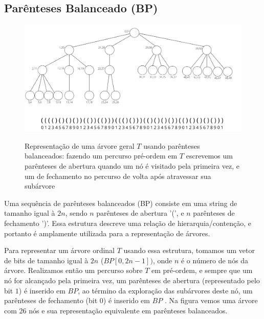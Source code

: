 \subsection{Parênteses Balanceado (BP)}\label{sec:sec-parenthesis-balanceados}
\begin{figure}[!ht]
\centering
  \caption[Representação de árvores com parênteses balanceados]{Representação de uma árvore geral $T$ usando parênteses balanceados: fazendo um percurso pré-ordem em $T$ escrevemos um parênteses de abertura quando um nó é visitado pela primeira vez, e um de fechamento no percurso de volta após atravessar sua subárvore \citep{paper-succint-representation-of-balanced-parentheses}}
  \includegraphics[width=\columnwidth]{images/arvore_geral.png}
  \label{fig:parenthesis-representation}
\end{figure}
Uma sequência de parênteses balanceados (BP) consiste em uma string de tamanho igual à $2n$, sendo $n$ parênteses de abertura '(', e $n$ parênteses de fechamento ')'. Essa estrutura descreve uma relação de hierarquia/contenção, e portanto é amplamente utilizada para a representação de árvores.

Para representar um árvore ordinal $T$ usando essa estrutura, tomamos um vetor de bits de tamanho igual à $2n$ ($BP[0,2n-1])$, onde $n$ é o número de nós da árvore. Realizamos então um percurso sobre $T$ em pré-ordem, e sempre que um nó for alcançado pela primeira vez, um parênteses de abertura (representado pelo bit $1$) é inserido em $BP$, ao término da exploração das subárvores deste nó, um parênteses de fechamento (bit $0$) é inserido em $BP$ \citep{paper-succint-trees-in-practice}.  Na figura  vemos uma árvore com 26 nós e sua representação equivalente em parênteses balanceados.


